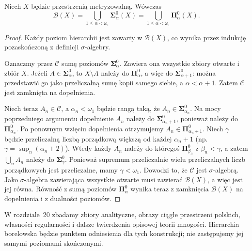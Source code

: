 \begin{twierdzenie}
\label{thm:topog-polskie-borel-wyczerpanie}
Niech $X$ będzie przestrzenią
metryzowalną. Wówczas
\[
\mathcal B(X)=
\bigcup_{1\le\alpha<\omega_1}
\boldsymbol\Sigma^0_\alpha(X)
=
\bigcup_{1\le\alpha<\omega_1}
\boldsymbol\Pi^0_\alpha(X).
\]
\end{twierdzenie}
\begin{proof}
Każdy poziom hierarchii
jest zawarty w $\mathcal B(X)$,
co wynika przez indukcję
pozaskończoną z definicji
$\sigma$-algebry.

Oznaczmy przez $\mathcal C$
sumę poziomów
$\boldsymbol\Sigma^0_\alpha$.
Zawiera ona wszystkie zbiory
otwarte i zbiór $X$.
Jeżeli
$A\in\boldsymbol\Sigma^0_\alpha$,
to $X\setminus A$ należy do
$\boldsymbol\Pi^0_\alpha$,
a więc do
$\boldsymbol\Sigma^0_{\alpha+1}$:
można przedstawić go jako
przeliczalną sumę kopii
samego siebie, a
$\alpha<\alpha+1$.
Zatem $\mathcal C$ jest
zamknięta na dopełnienia.

Niech teraz
$A_n\in\mathcal C$,
a $\alpha_n<\omega_1$
będzie rangą taką, że
$A_n\in\boldsymbol\Sigma^0_{\alpha_n}$.
Na mocy poprzedniego argumentu
dopełnienie $A_n$ należy do
$\boldsymbol\Sigma^0_{\alpha_n+1}$,
ponieważ należy do
$\boldsymbol\Pi^0_{\alpha_n}$.
Po ponownym wzięciu dopełnienia
otrzymujemy
$A_n\in\boldsymbol\Pi^0_{\alpha_n+1}$.
Niech $\gamma$ będzie przeliczalną
liczbą porządkową większą od
każdej $\alpha_n+1$
(np. $\gamma=\sup_n(\alpha_n+2)$).
Wtedy każdy $A_n$ należy
do któregoś
$\boldsymbol\Pi^0_{\beta_n}$
z $\beta_n<\gamma$, a zatem
$\bigcup_nA_n$ należy do
$\boldsymbol\Sigma^0_\gamma$.
Ponieważ supremum przeliczalnie
wielu przeliczalnych liczb
porządkowych jest przeliczalne,
mamy $\gamma<\omega_1$.
Dowodzi to, że $\mathcal C$
jest $\sigma$-algebrą.
Jako $\sigma$-algebra
zawierająca wszystkie otwarte
musi zawierać $\mathcal B(X)$,
a więc jest jej równa.
Równość z sumą poziomów
$\boldsymbol\Pi^0_\alpha$
wynika teraz z zamknięcia
$\mathcal B(X)$ na dopełnienia
i z dualności poziomów.
\end{proof}

\begin{uwaga}
W rozdziale~20 zbadamy zbiory
analityczne, obrazy ciągłe
przestrzeni polskich, własności
regularności i dalsze twierdzenia
opisowej teorii mnogości.
Hierarchia borelowska będzie
punktem odniesienia dla tych
konstrukcji; nie zastępujemy
jej samymi poziomami skończonymi.
\end{uwaga}

